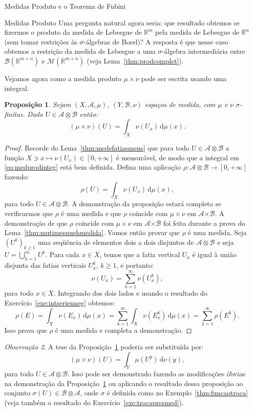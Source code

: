 \documentclass[oneside,final,11pt]{amsbook}
\newcommand{\R}{\mathds R}
\newcommand{\Times}{\pmb{\times}}
\newcommand{\dd}{\mathrm d}
\newcommand{\Borel}{\mathcal B}
\newcommand{\Lebmens}{\mathcal M}
\theoremstyle{remark}\newtheorem{exercise}{Exercício}[chapter]
\theoremstyle{remark}\newtheorem{*exercise}[exercise]{\hbox to 0pt{\hskip 0pt minus 1fil*}Exercício}
\theoremstyle{definition}\newtheorem{exdefin}{Definição}[chapter]
\theoremstyle{plain}\newtheorem{teo}{Teorema}[section]
\theoremstyle{plain}\newtheorem{lem}[teo]{Lema}
\theoremstyle{plain}\newtheorem{prop}[teo]{Proposição}
\theoremstyle{plain}\newtheorem{cor}[teo]{Corolário}
\theoremstyle{definition}\newtheorem{defin}[teo]{Definição}
\theoremstyle{remark}\newtheorem{rem}[teo]{Observação}
\theoremstyle{definition}\newtheorem{notation}[teo]{Notação}
\theoremstyle{definition}\newtheorem{convention}[teo]{Convenção}
\theoremstyle{definition}\newtheorem{example}[teo]{Exemplo}
\numberwithin{section}{chapter}
\numberwithin{equation}{section}
\begin{document}
\begin{chapter}{Medidas Produto e o Teorema de Fubini}
\begin{section}{Medidas Produto}
Uma pergunta natural agora seria: que resultado obtemos se fizermos o produto da medida de Lebesgue de $\R^m$
pela medida de Lebesgue de $\R^n$ (sem tomar restrições às $\sigma$-álgebras de Borel)? A resposta é que nesse
caso obtemos a restrição da medida de Lebesgue a uma $\sigma$-álgebra intermediária entre $\Borel(\R^{m+n})$
e $\Lebmens(\R^{m+n})$ (veja Lema~\ref{thm:prodcomplet}).

Vejamos agora como a medida produto $\mu\times\nu$ pode ser escrita usando uma integral.
\begin{prop}\label{thm:Fubinicarac}
Sejam $(X,\mathcal A,\mu)$, $(Y,\mathcal B,\nu)$ espaços de medida, com $\mu$ e $\nu$ $\sigma$-finitas.
Dado $U\in\mathcal A\otimes\mathcal B$ então:
\begin{equation}\label{eq:medprodinteg}
(\mu\times\nu)(U)=\int_X\nu(U_x)\,\dd\mu(x).
\end{equation}
\end{prop}
\begin{proof}
Recorde do Lema~\ref{thm:medefatiasmens} que para todo $U\in\mathcal A\otimes\mathcal B$ a função
$X\ni x\mapsto\nu(U_x)\in[0,+\infty]$ é mensurável, de modo que a integral em \eqref{eq:medprodinteg}
está bem definida. Defina uma aplicação $\rho:\mathcal A\otimes\mathcal B\to[0,+\infty]$ fazendo:
\[\rho(U)=\int_X\nu(U_x)\,\dd\mu(x),\]
para todo $U\in\mathcal A\otimes\mathcal B$. A demonstração da proposição estará completa se verificarmos que
$\rho$ é uma medida e que $\rho$ coincide com $\mu\times\nu$ em $\mathcal A\Times\mathcal B$.
A demonstração de que $\rho$ coincide com $\mu\times\nu$ em $\mathcal A\Times\mathcal B$
foi feita durante a prova do Lema~\ref{thm:mutimesnuehmedida}. Vamos então provar que $\rho$
é uma medida. Seja $(U^k)_{k\ge1}$ uma seqüência de elementos dois a dois disjuntos de $\mathcal A\otimes\mathcal B$ e seja
$U=\bigcup_{k=1}^\infty U^k$. Para cada $x\in X$, temos que a fatia vertical $U_x$ é igual à união disjunta das fatias
verticais $U^k_x$, $k\ge1$, e portanto:
\[\nu(U_x)=\sum_{k=1}^\infty\nu(U^k_x),\]
para todo $x\in X$. Integrando dos dois lados e usando o resultado do Exercício~\ref{exe:intserienneg} obtemos:
\[\rho(E)=\int_X\nu(E_x)\,\dd\mu(x)=\sum_{k=1}^\infty\int_X\nu(E^k_x)\,\dd\mu(x)
=\sum_{k=1}^\infty\rho(E^k).\]
Isso prova que $\rho$ é uma medida e completa a demonstração.
\end{proof}

\begin{rem}
A tese da Proposição~\ref{thm:Fubinicarac} poderia ser substituída por:
\[(\mu\times\nu)(U)=\int_Y\mu(U^y)\,\dd\nu(y),\]
para todo $U\in\mathcal A\otimes\mathcal B$.
Isso pode ser demonstrado fazendo as modificações óbvias na demonstração da Proposição~\ref{thm:Fubinicarac}
ou aplicando o resultado dessa proposição ao conjunto $\sigma(U)\in\mathcal B\otimes\mathcal A$,
onde $\sigma$ é definida como no Exemplo~\ref{thm:funcaotroca} (veja também o resultado do Exercício~\ref{exe:trocapresmed}).


\end{rem}
\end{section}
\end{chapter}
\end{document}
